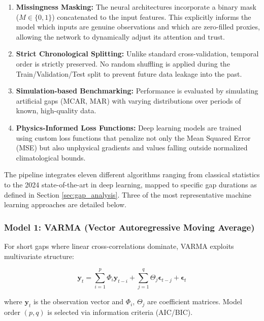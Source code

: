 \documentclass[12pt,a4paper]{article}
\begin{document}
\begin{enumerate}
    \item \textbf{Missingness Masking:} The neural architectures incorporate a binary mask ($M \in \{0,1\}$) concatenated to the input features. This explicitly informs the model which inputs are genuine observations and which are zero-filled proxies, allowing the network to dynamically adjust its attention and trust.
    \item \textbf{Strict Chronological Splitting:} Unlike standard cross-validation, temporal order is strictly preserved. No random shuffling is applied during the Train/Validation/Test split to prevent future data leakage into the past.
    \item \textbf{Simulation-based Benchmarking:} Performance is evaluated by simulating artificial gaps (MCAR, MAR) with varying distributions over periods of known, high-quality data.
    \item \textbf{Physics-Informed Loss Functions:} Deep learning models are trained using custom loss functions that penalize not only the Mean Squared Error (MSE) but also unphysical gradients and values falling outside normalized climatological bounds.
\end{enumerate}

The pipeline integrates eleven different algorithms ranging from classical statistics to the 2024 state-of-the-art in deep learning, mapped to specific gap durations as defined in Section \ref{sec:gap_analysis}. Three of the most representative machine learning approaches are detailed below.

\subsubsection{Model 1: VARMA (Vector Autoregressive Moving Average)}

For short gaps where linear cross-correlations dominate, VARMA exploits multivariate structure:

\begin{equation}
    \mathbf{y}_t = \sum_{i=1}^{p} \Phi_i \mathbf{y}_{t-i} + \sum_{j=1}^{q} \Theta_j \boldsymbol{\epsilon}_{t-j} + \boldsymbol{\epsilon}_t
\end{equation}

where $\mathbf{y}_t$ is the observation vector and $\Phi_i$, $\Theta_j$ are coefficient matrices. Model order $(p,q)$ is selected via information criteria (AIC/BIC).
\end{document}
